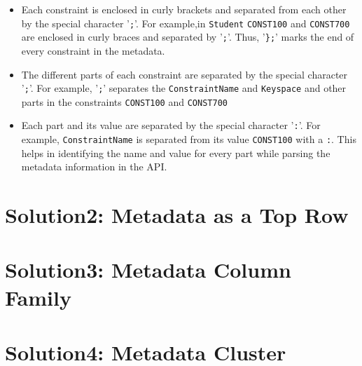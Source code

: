 	\begin{itemize}
	\item Each constraint is enclosed in curly brackets and separated from each
	other by the special character '\texttt{;}'. For example,in \texttt{Student}
	\texttt{CONST100} and \texttt{CONST700} are enclosed in curly braces and
	separated by '\texttt{;}'. Thus, '\texttt{\};}' marks the end of every
	constraint in the metadata.


	\item The different parts of each constraint are separated by the special character
	'\texttt{;}'. For example,  '\texttt{;}' separates the \texttt{ConstraintName}
	 and \texttt{Keyspace} and other parts in the constraints \texttt{CONST100} and
	 \texttt{CONST700}
	 
	 
	\item Each part and its value are separated by the special character
	'\texttt{:}'. For example, \texttt{ConstraintName} is separated from
	its value \texttt{CONST100} with a \texttt{:}. This helps in identifying the
	name and value for every part while parsing the metadata information
	in the \ac{API}.
	
	\end{itemize}






\section{Solution2:  Metadata as a Top Row} \label{s:design-sol2}
\section{Solution3:  Metadata Column Family} \label{s:design-sol3}
\section{Solution4:  Metadata Cluster} \label{s:design-sol4}



